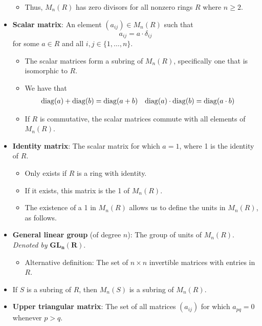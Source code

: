 \documentclass[../notes.tex]{subfiles}
\begin{document}
\begin{itemize}
    \begin{itemize}
        \item Thus, $M_n(R)$ has zero divisors for all nonzero rings $R$ where $n\geq 2$.
    \end{itemize}
    \item \textbf{Scalar matrix}: An element $(a_{ij})\in M_n(R)$ such that
    \begin{equation*}
        a_{ij} = a\cdot\delta_{ij}
    \end{equation*}
    for some $a\in R$ and all $i,j\in\{1,\dots,n\}$.
    \begin{itemize}
        \item The scalar matrices form a subring of $M_n(R)$, specifically one that is isomorphic to $R$.
        \item We have that
        \begin{align*}
            \operatorname{diag}(a)+\operatorname{diag}(b) &= \operatorname{diag}(a+b)&
            \operatorname{diag}(a)\cdot\operatorname{diag}(b) &= \operatorname{diag}(a\cdot b)
        \end{align*}
        \item If $R$ is commutative, the scalar matrices commute with all elements of $M_n(R)$.
    \end{itemize}
    \item \textbf{Identity matrix}: The scalar matrix for which $a=1$, where 1 is the identity of $R$.
    \begin{itemize}
        \item Only exists if $R$ is a ring with identity.
        \item If it exists, this matrix is the 1 of $M_n(R)$.
        \item The existence of a 1 in $M_n(R)$ allows us to define the units in $M_n(R)$, as follows.
    \end{itemize}
    \item \textbf{General linear group} (of degree $n$): The group of units of $M_n(R)$. \emph{Denoted by} $\bm{GL_n(R)}$.
    \begin{itemize}
        \item Alternative definition: The set of $n\times n$ invertible matrices with entries in $R$.
    \end{itemize}
    \item If $S$ is a subring of $R$, then $M_n(S)$ is a subring of $M_n(R)$.
    \item \textbf{Upper triangular matrix}: The set of all matrices $(a_{ij})$ for which $a_{pq}=0$ whenever $p>q$.
    \begin{itemize}

\end{itemize}
\end{itemize}
\end{document}
